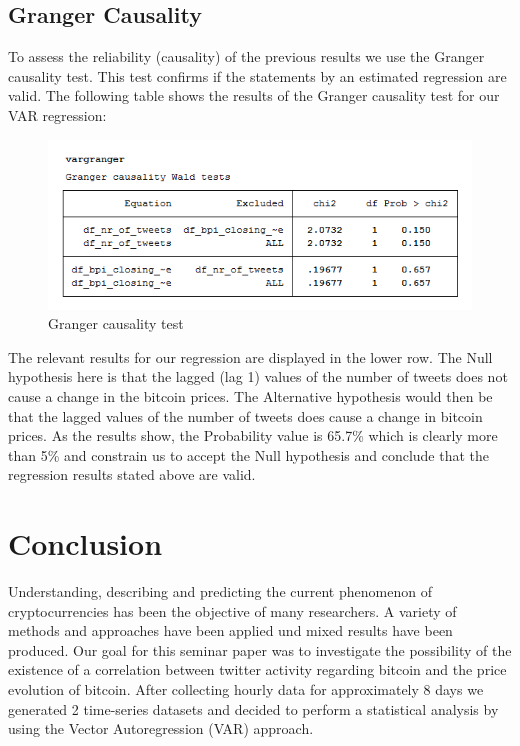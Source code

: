 \documentclass[a4paper,american,12pt]{article}
\begin{document}
\begin{spacing}{1.2}
\subsection{Granger Causality}
To assess the reliability (causality) of the previous results we use the Granger causality test. This test confirms if the statements by an estimated regression are valid. The following table shows the results of the Granger causality test for our VAR regression:\\

\begin{figure}[H]
\centering
\includegraphics[scale=0.85]{stata_export_graphs/granger_test.png}
\caption{Granger causality test}
\label{fig:6}
\end{figure}

The relevant results for our regression are displayed in the lower row. The Null hypothesis here is that the lagged (lag 1) values of the number of tweets does not cause a change in the bitcoin prices. The Alternative hypothesis would then be that the lagged values of the number of tweets does cause a change in bitcoin prices. As the results show, the Probability value is 65.7\% which is clearly more than 5\% and constrain us to accept the Null hypothesis and conclude that the regression results stated above are valid.\\

\clearpage

\section{Conclusion}
\label{sec:Conclustion}
Understanding, describing and predicting the current phenomenon of cryptocurrencies has been the objective of many researchers. A variety of methods and approaches have been applied und mixed results have been produced. Our goal for this seminar paper was to investigate the possibility of the existence of a correlation between twitter activity regarding bitcoin and the price evolution of bitcoin. After collecting hourly data for approximately 8 days we generated 2 time-series datasets and decided to perform a statistical analysis by using the Vector Autoregression (VAR) approach.\\


\end{spacing}
\end{document}
